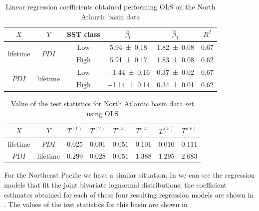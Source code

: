 \begin{table}[H]
	\centering
	\begin{tabular}{cccccc}
		\toprule
		\toprule
		$X$ & $Y$ & SST class & $\hat{\beta}_{0}$ & $\hat{\beta}_{1}$ & $R^{2}$ \\
		\midrule
		\multirow{2}{*}{lifetime} & \multirow{2}{*}{$PDI$}
		 & Low  & \num{ 5.94 \pm 0.18} & \num{1.82 \pm 0.08} & \num{0.67} \\ %
		&& High & \num{ 5.91 \pm 0.17} & \num{1.83 \pm 0.08} & \num{0.62} \\ %
		\midrule
		\multirow{2}{*}{$PDI$} & \multirow{2}{*}{lifetime}
		 & Low  & \num{-1.44 \pm 0.16} & \num{0.37 \pm 0.02} & \num{0.67} \\ %
		&& High & \num{-1.14 \pm 0.14} & \num{0.34 \pm 0.01} & \num{0.62} \\ %
		\bottomrule
	\end{tabular}
	\caption{Linear regression coefficients obtained performing OLS on the North Atlantic basin data}
	\label{tab:natl-ols-coefs}
\end{table}

\begin{table}[H]
	\centering
	\begin{tabular}{cccccccc}
	\toprule
	\toprule
	$X$   & $Y$   & $T^{(1)}$ & $T^{(2)}$ & $T^{(3)}$ & $T^{(4)}$ & $T^{(5)}$ & $T^{(6)}$ \\
	\midrule
	lifetime & $PDI$ & $0.025$ & $0.001$ & $0.051$ & $0.101$ & $0.010$ & $0.111$ \\
	$PDI$ & lifetime & $0.299$ & $0.028$ & $0.051$ & $1.388$ & $1.295$ & $2.683$ \\
	\bottomrule
	\end{tabular}
	\caption{Value of the test statistics for North Atlantic basin data set using OLS}
	\label{tab:base-natl-ols-statistics}
\end{table}

\bigskip
For the Northeast Pacific we have a similar situation. In  we can see the regression models that fit the joint bivariate lognormal distributions; the coefficient estimates obtained for each of these four resulting regression models are shown in . The values of the test statistics for this basin are shown in .


